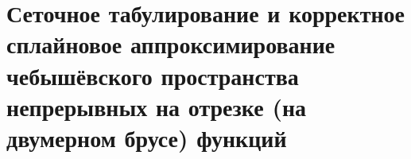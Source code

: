 \documentclass[__main__.tex]{subfiles}
\begin{document}
\section{Сеточное табулирование и корректное сплайновое аппроксимирование чебышёвского пространства непрерывных на отрезке (на двумерном брусе) функций}
\end{document}
